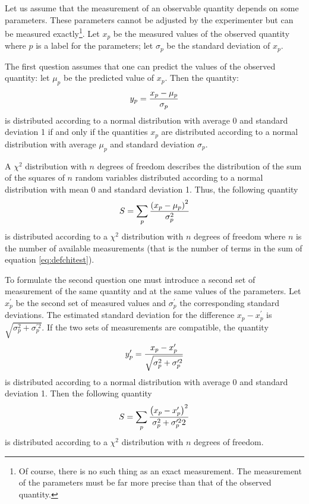 \documentclass[twoside]{book}
\begin{document}
Let us assume that the measurement of an observable quantity
depends on some parameters. These parameters cannot be adjusted by
the experimenter but can be measured exactly\footnote{Of course,
there is no such thing as an exact measurement. The measurement of
the parameters must be far more precise than that of the observed
quantity.}. Let $x_p$ be the measured values of the observed
quantity where $p$ is a label for the parameters; let $\sigma_p$
be the standard deviation of $x_p$.

The first question assumes that one can predict the values of the
observed quantity: let $\mu_p$ be the predicted value of $x_p$.
Then the quantity:
\begin{equation}
  y_p = { x_p - \mu_p \over \sigma_p}
\end{equation}
is distributed according to a normal distribution with average 0
and standard deviation 1 if and only if the quantities $x_p$ are
distributed according to a normal distribution with average
$\mu_p$ and standard deviation $\sigma_p$.

A $\chi^2$ distribution with $n$ degrees of freedom describes the
distribution of the sum of the squares of $n$ random variables
distributed according to a normal distribution with mean 0 and
standard deviation 1. Thus, the following quantity
\begin{equation}
\label{eq:defchitest}
  S=\sum_p { \left(x_p - \mu_p\right)^2\over \sigma_p^2}
\end{equation}
is distributed according to a $\chi^2$ distribution with $n$
degrees of freedom where $n$ is the number of available
measurements (that is the number of terms in the sum of equation
\ref{eq:defchitest}).

To formulate the second question one must introduce a second set
of measurement of the same quantity and at the same values of the
parameters. Let $x^{\prime}_p$ be the second set of measured
values and $\sigma^{\prime}_p$ the corresponding standard
deviations. The estimated standard deviation for the difference
$x_p - x^{\prime}_p$ is $\sqrt{\sigma_p^2+\sigma^{\prime 2}_p }$.
If the two sets of measurements are compatible, the quantity
\begin{equation}
  y^{\prime}_p = { x_p - x^{\prime}_p \over
  \sqrt{\sigma_p^2+\sigma^{\prime 2}_p}}
\end{equation}
is distributed according to a normal distribution with average 0
and standard deviation 1. Then the following quantity
\begin{equation}
\label{eq:defchitestcmp}
  S=\sum_p { \left(x_p - x^{\prime}_p\right)^2\over \sigma_p^2+\sigma^{\prime 2}_p2}
\end{equation}
is distributed according to a $\chi^2$ distribution with $n$
degrees of freedom.
\end{document}
